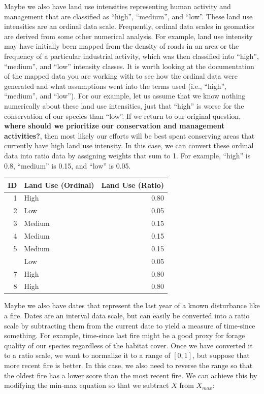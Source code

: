 \documentclass[
]{book}
\begin{document}
Maybe we also have land use intensities representing human activity and management that are classified as ``high'', ``medium'', and ``low''. These land use intensities are an ordinal data scale. Frequently, ordinal data scales in geomatics are derived from some other numerical analysis. For example, land use intensity may have initially been mapped from the density of roads in an area or the frequency of a particular industrial activity, which was then classified into ``high'', ``medium'', and ``low'' intensity classes. It is worth looking at the documentation of the mapped data you are working with to see how the ordinal data were generated and what assumptions went into the terms used (i.e., ``high'', ``medium'', and ``low''). For our example, let us assume that we know nothing numerically about these land use intensities, just that ``high'' is worse for the conservation of our species than ``low''. If we return to our original question, \textbf{where should we prioritize our conservation and management activities?}, then most likely our efforts will be best spent conserving areas that currently have high land use intensity. In this case, we can convert these ordinal data into ratio data by assigning weights that sum to 1. For example, ``high'' is 0.8, ``medium'' is 0.15, and ``low'' is 0.05.

\begin{tabular}{rlr}
\toprule
ID & Land Use (Ordinal) & Land Use (Ratio)\\
\midrule
1 & High & 0.80\\
2 & Low & 0.05\\
3 & Medium & 0.15\\
4 & Medium & 0.15\\
5 & Medium & 0.15\\
\addlinespace
6 & Low & 0.05\\
7 & High & 0.80\\
8 & High & 0.80\\
\bottomrule
\end{tabular}

Maybe we also have dates that represent the last year of a known disturbance like a fire. Dates are an interval data scale, but can easily be converted into a ratio scale by subtracting them from the current date to yield a measure of time-since something. For example, time-since last fire might be a good proxy for forage quality of our species regardless of the habitat cover. Once we have converted it to a ratio scale, we want to normalize it to a range of \([0,1]\), but suppose that more recent fire is better. In this case, we also need to reverse the range so that the oldest fire has a lower score than the most recent fire. We can achieve this by modifying the min-max equation so that we subtract \(X\) from \(X_{max}\):
\end{document}
